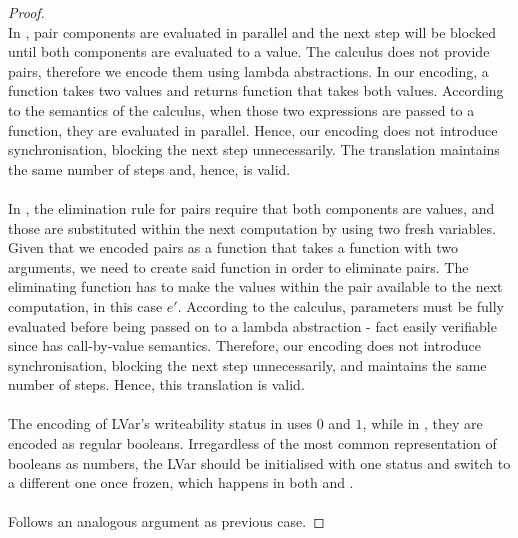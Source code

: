 \documentclass[main.tex]{subfiles}
\begin{document}
\begin{proof}

   \\
  In \typedlvar, pair components are evaluated in parallel and the next step will
  be blocked until both components are evaluated to a value. The \lvar calculus
  does not provide pairs, therefore we encode them using lambda abstractions.
  In our encoding, a function takes two values and returns function that takes
  both values. According to the semantics of the \lvar  calculus, when those two
  expressions are passed to a function, they are evaluated in parallel. Hence,
  our encoding does not introduce synchronisation, blocking the next step
  unnecessarily. The translation maintains the same number of steps and, hence,
  is valid. \\

   \\
  In \typedlvar, the elimination rule for pairs require that both components are
  values, and those are substituted within the next computation by using two
  fresh variables. Given that we encoded pairs as a function that takes a
  function with two arguments, we need to create said function in order to
  eliminate pairs. The eliminating function has to make the values within the
  pair available to the next computation, in this case $e'$. According to the
  \lvar calculus, parameters must be fully evaluated before being passed on to a
  lambda abstraction - fact easily verifiable since \lvar  has call-by-value
  semantics. Therefore, our encoding does not introduce synchronisation, blocking
  the next step unnecessarily, and maintains the same number of steps. Hence,
  this translation is valid. \\



   \\
  The encoding of LVar's writeability status in \typedlvar uses $0$ and $1$,
  while in \lvar, they are encoded as regular booleans. Irregardless of the most
  common representation of booleans as numbers, the LVar should be initialised
  with one status and switch to a different one once frozen, which happens in
  both \lvar and \typedlvar.\\

  \\
  Follows an analogous argument as previous case.



\end{proof}
\end{document}
